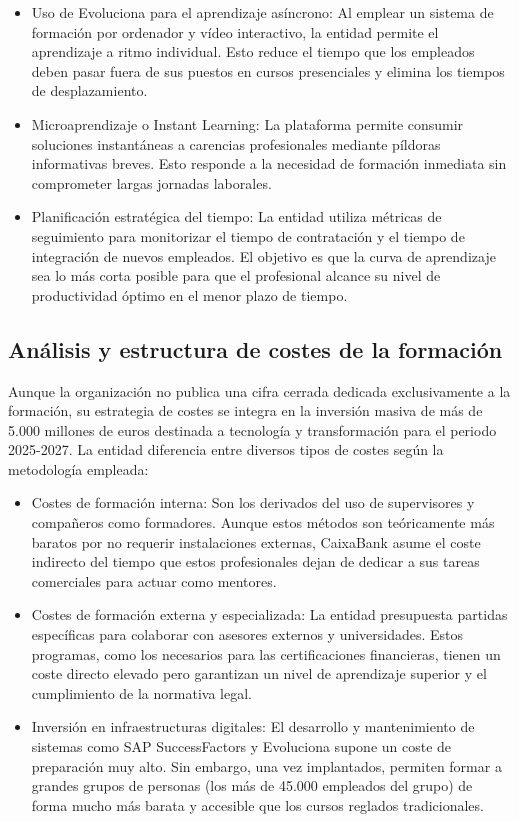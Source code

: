 \begin{itemize}
    \item Uso de Evoluciona para el aprendizaje asíncrono: Al emplear un sistema de formación por ordenador y vídeo interactivo, la entidad permite el aprendizaje a ritmo individual. Esto reduce el tiempo que los empleados deben pasar fuera de sus puestos en cursos presenciales y elimina los tiempos de desplazamiento.
    \item Microaprendizaje o Instant Learning: La plataforma permite consumir soluciones instantáneas a carencias profesionales mediante píldoras informativas breves. Esto responde a la necesidad de formación inmediata sin comprometer largas jornadas laborales.
    \item Planificación estratégica del tiempo: La entidad utiliza métricas de seguimiento para monitorizar el tiempo de contratación y el tiempo de integración de nuevos empleados. El objetivo es que la curva de aprendizaje sea lo más corta posible para que el profesional alcance su nivel de productividad óptimo en el menor plazo de tiempo.
\end{itemize}

\subsection{Análisis y estructura de costes de la formación}

Aunque la organización no publica una cifra cerrada dedicada exclusivamente a la formación, su estrategia de costes se integra en la inversión masiva de más de 5.000 millones de euros destinada a tecnología y transformación para el periodo 2025-2027. La entidad diferencia entre diversos tipos de costes según la metodología empleada:

\begin{itemize}
    \item Costes de formación interna: Son los derivados del uso de supervisores y compañeros como formadores. Aunque estos métodos son teóricamente más baratos por no requerir instalaciones externas, CaixaBank asume el coste indirecto del tiempo que estos profesionales dejan de dedicar a sus tareas comerciales para actuar como mentores.
    \item Costes de formación externa y especializada: La entidad presupuesta partidas específicas para colaborar con asesores externos y universidades. Estos programas, como los necesarios para las certificaciones financieras, tienen un coste directo elevado pero garantizan un nivel de aprendizaje superior y el cumplimiento de la normativa legal.
    \item Inversión en infraestructuras digitales: El desarrollo y mantenimiento de sistemas como SAP SuccessFactors y Evoluciona supone un coste de preparación muy alto. Sin embargo, una vez implantados, permiten formar a grandes grupos de personas (los más de 45.000 empleados del grupo) de forma mucho más barata y accesible que los cursos reglados tradicionales.
\end{itemize}

